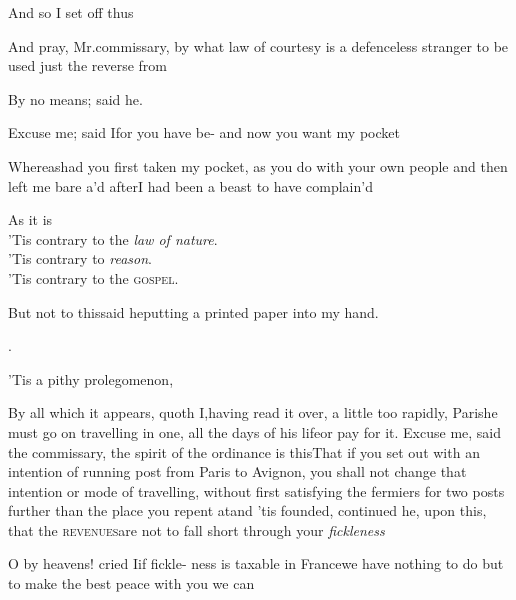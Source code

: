 \documentclass{article}
\begin{document}
And so I set off thus\tsh

\newpage
\tsh And pray, Mr.\@ commissary, by\break
what law of courtesy is a defenceless\break
stranger to be used just the reverse from\break
{}

By no means; said he.

Excuse me; said I\tsk for you have be-\break
{}\break
\tsk and now you want my pocket\tsh

Whereas\tsk had you first taken my pocket, as you do with your
own people\break
\tsk and then left me bare \hbox{a\tsk’d} after\tsk I had been a beast to have
complain’d\tsh

As it is\tsh\\
\tsh ’Tis contrary to the \textit{law of nature}.\\
\tsh ’Tis contrary to \textit{reason}.\\
\tsh ’Tis contrary to the \textsc{gospel}.

But not to this\tsh said he\tsk putting a printed
paper into my hand.\\
\centerline{.}

\newpage
\tsh\tsh ’Tis a pithy prolegomenon,
\break
\stick{\tsk \tsk \tsk \tsk \tsk \tsk \tsk \tsk \tsk \tsk \tsk \tsk}
\stick{\tsk \tsk \tsk \tsk \tsk \tsk \tsk \tsk \tsk \tsk \tsk \tsk}
\stick{\tsk \tsk \tsk \tsk \tsk \tsk \tsk \tsk \tsk \tsk \tsk \tsk}
\stick{\tsk \tsk \tsk \tsk \tsk \tsk \tsk \tsk \tsk \tsk \tsk \tsk}

\tsh By all which it appears, quoth I,\break having read it
over, a little too rapidly, 
Paris\tsk he must go on travelling in one, all the
days of his life\tsk or pay for it.\tsk\break
Excuse me, said the commissary, the spirit of the ordinance is
this\tsk That if you set out with an intention of running post
from Paris to Avignon, \etc you shall not change that intention
or mode of travelling, without first satisfying the fermiers for
two posts further than the place you repent at\tsk and ’tis
founded, continued he, upon this, that the \textsc{revenues}\pb are
not to fall short through your \textit{fickleness}\tsh

\tsh O by heavens! cried I\tsk if
fickle-\break
ness is taxable in France\tsk we have nothing to do
but to make the best peace with you we can\tsh\\[4pt]
\end{document}
